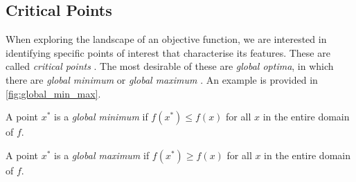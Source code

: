\subsection{Critical Points}
\label{ssec:critical_points}

When exploring the landscape of an objective function, we are interested in identifying specific points of interest that characterise its features. These are called \textit{critical points} \citep{deep_learning_book, mml_book}. The most desirable of these are \textit{global optima}, in which there are \textit{global minimum} or \textit{global maximum} \citep{NoceWrig06}. An example is provided in \cref{fig:global_min_max}.

\begin{definition}
    A point $x^*$ is a \textit{global minimum} if $f(x^*) \leq f(x)$ for all $x$ in the entire domain of $f$.
\end{definition}

\begin{definition}
    A point $x^*$ is a \textit{global maximum} if $f(x^*) \geq f(x)$ for all $x$ in the entire domain of $f$.
\end{definition}

